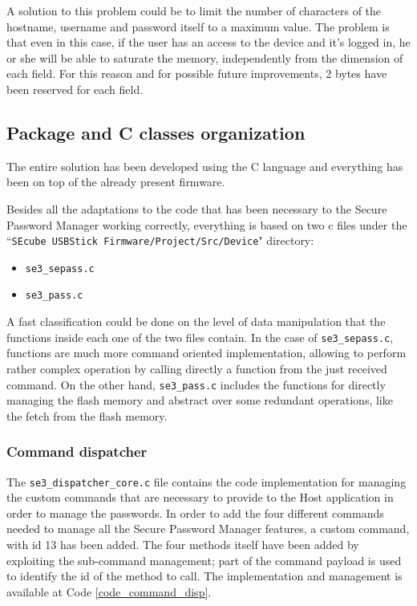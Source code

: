 A solution to this problem could be to limit the number of characters of the hostname, username and password itself to a maximum value. The problem is that even in this case, if the user has an access to the device and it's logged in, he or she will be able to saturate the memory, independently from the dimension of each field. For this reason and for possible future improvements, 2 bytes have been reserved for each field.


\subsection{Package and C classes organization}

The entire solution has been developed using the C language and everything has been on top of the already present firmware.

Besides all the adaptations to the code that has been necessary to the Secure Password Manager working correctly, everything is based on two c files under the ``\texttt{SEcube USBStick Firmware/Project/Src/Device}" directory:
\begin{itemize}
	\item \texttt{se3\_sepass.c}
	\item \texttt{se3\_pass.c}
\end{itemize}

A fast classification could be done on the level of data manipulation that the functions inside each one of the two files contain. In the case of \texttt{se3\_sepass.c}, functions are much more command oriented implementation, allowing to perform rather complex operation by calling directly a function from the just received command. On the other hand, \texttt{se3\_pass.c} includes the functions for directly managing the flash memory and abstract over some redundant operations, like the fetch from the flash memory. 


\subsubsection{Command dispatcher}
The \texttt{se3\_dispatcher\_core.c} file contains the code implementation for managing the custom commands that are necessary to provide to the Host application in order to manage the passwords.\newline\newline
In order to add the four different commands needed to manage all the Secure Password Manager features, a custom command, with id 13 has been added. The four methods itself have been added by exploiting the sub-command management; part of the command payload is used to identify the id of the method to call. The implementation and management is available at Code \ref{code_command_disp}.

